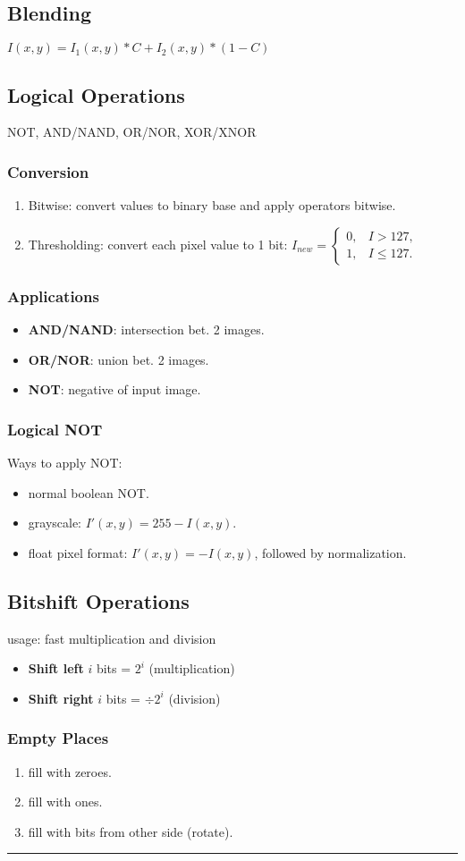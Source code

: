 \subsection{Blending}
$I(x,y) = I_1(x,y) * C +  I_2(x,y) * (1-C)$\\
\subsection{Logical Operations}
\textsc{NOT, AND/NAND, OR/NOR, XOR/XNOR}
\subsubsection{Conversion}
\begin{enumerate}
  \item Bitwise: convert values to binary base and apply operators bitwise.
  \item Thresholding: convert each pixel value to 1 bit:
$
  I_{new} =
  \begin{cases}
    0, & I > 127,\\
    1, & I \leq 127.
  \end{cases}
$
\end{enumerate}
\subsubsection{Applications}
\begin{itemize}
  \item \textbf{AND/NAND}: intersection bet. 2 images.
  \item \textbf{OR/NOR}: union bet. 2 images.
  \item \textbf{NOT}: negative of input image.
\end{itemize}
\subsubsection{Logical NOT}
Ways to apply NOT:
\begin{itemize}
  \item normal boolean NOT.
  \item grayscale: $I'(x,y) = 255 - I(x,y)$.
  \item float pixel format: $I'(x,y) = - I(x,y)$, followed by normalization.
\end{itemize}
\subsection{Bitshift Operations}
usage: fast multiplication and division
\begin{itemize}
  \item \textbf{Shift left} $i$ bits = $2^i$ (multiplication)
  \item \textbf{Shift right} $i$ bits = $\div 2^i$ (division)
\end{itemize}
\subsubsection{Empty Places}
\begin{enumerate}
  \item fill with zeroes.
  \item fill with ones.
  \item fill with bits from other side (rotate).
\end{enumerate}
\hrule
